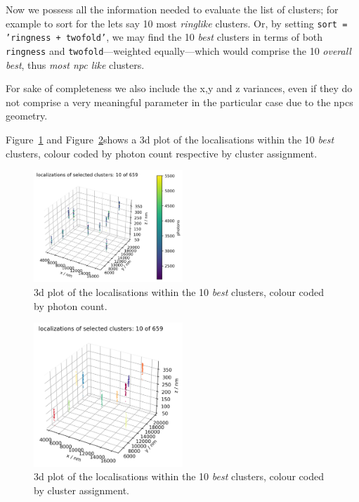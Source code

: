 \documentclass[11pt, a4paper, oneside, twocolumn]{report}
\renewcommand{\tt}{\texttt}
\newcommand{\e}{\emph}
\begin{document}
Now we possess all the information needed to evaluate the list of
clusters; for example to sort for the lets say 10 most \e{ringlike}
clusters. Or, by setting \tt{sort = 'ringness + twofold'}, we may find
the 10 \e{best} clusters in terms of both \tt{ringness} and
\tt{twofold}---weighted equally---which would comprise the 10
\e{overall best}, thus \e{most \gls{npc} like} clusters.

For sake of completeness we also include the x,y and z variances, even
if they do not comprise a very meaningful parameter in the particular
case due to the \gls{npc}s geometry.

Figure~\ref{f:8_best_filtered_clusters} and
Figure~\ref{f:9_best_filtered_clusters}shows a 3d plot of the
localisations within the 10 \e{best} clusters, colour coded by photon
count respective by cluster assignment.

\begin{figure}[h!]
  \centering
  \includegraphics[width=0.5\textwidth]{8_best_filtered_clusters.png}
  \caption{3d plot of the localisations within the 10 \e{best}
    clusters, colour coded by photon count.}
  \label{f:8_best_filtered_clusters}
\end{figure}

\begin{figure}[h!]
  \centering
  \includegraphics[width=0.5\textwidth]{9_best_filtered_clusters.png}
  \caption{3d plot of the localisations within the 10 \e{best}
    clusters, colour coded by cluster assignment.}
  \label{f:9_best_filtered_clusters}
\end{figure}
\end{document}
